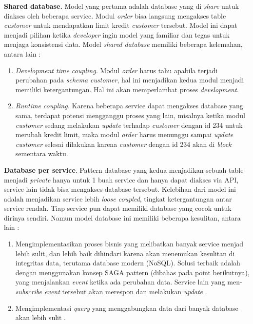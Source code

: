 \textbf{Shared database.} Model yang pertama adalah database yang di \textit{share} untuk diakses oleh beberapa service. Modul \textit{order} bisa langsung mengakses table \textit{customer} untuk mendapatkan limit kredit \textit{customer} tersebut. Model ini dapat menjadi pilihan ketika \textit{developer} ingin model yang familiar dan tegas untuk menjaga konsistensi data. Model \textit{shared database} memiliki beberapa kelemahan, antara lain :
\begin{enumerate}[leftmargin=*]
	\item \textit{Development time coupling.} Modul \textit{order} harus tahu apabila terjadi perubahan pada \textit{schema customer}, hal ini menjadikan kedua modul menjadi memiliki ketergantungan. Hal ini akan memperlambat proses \textit{development}.
	\item \textit{Runtime coupling.} Karena beberapa service dapat mengakses database yang sama, terdapat potensi mengganggu proses yang lain, misalnya ketika modul \textit{customer} sedang melakukan \textit{update} terhadap \textit{customer} dengan id 234 untuk merubah kredit limit, maka modul \textit{order} harus menunggu sampai \textit{update customer} selesai dilakukan karena \textit{customer} dengan id 234 akan di \textit{block} sementara waktu.
\end{enumerate}
\textbf{Database per service}. Pattern database yang kedua menjadikan sebuah table menjadi \textit{private} hanya untuk 1 buah service dan hanya dapat diakses via API, service lain tidak bisa mengakses database tersebut. Kelebihan dari model ini adalah menjadikan service lebih \textit{loose coupled}, tingkat ketergantungan antar service rendah. Tiap service pun dapat memiliki database yang cocok untuk dirinya sendiri. Namun model database ini memiliki beberapa kesulitan, antara lain :
\begin{enumerate}[leftmargin=*]
	\item Mengimplementasikan proses bisnis yang melibatkan banyak service menjad lebih sulit, dan lebih baik dihindari karena akan menemukan kesulitan di integritas data, terutama database modern (NoSQL). Solusi terbaik adalah dengan menggunakan konsep SAGA pattern (dibahas pada point berikutnya), yang menjalankan \textit{event} ketika ada perubahan data. Service lain yang men-\textit{subscribe event} tersebut akan merespon dan melakukan \textit{update} \cite{6}.
	\item Mengimplementasi \textit{query} yang menggabungkan data dari banyak database akan lebih sulit \cite{6}.
\end{enumerate}
